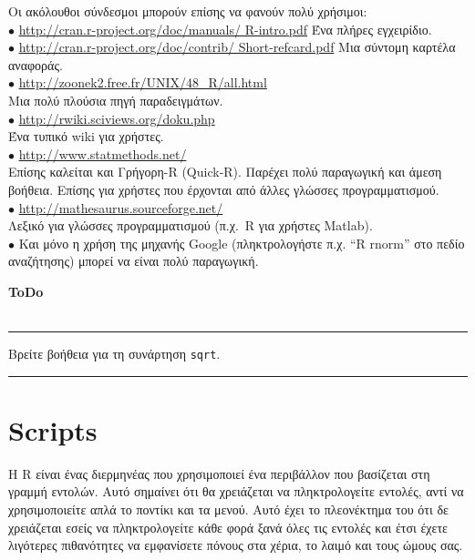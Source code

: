 \documentclass[a4paper,11pt,twocolumn,tablecaptionabove]{scrartcl}
\newenvironment{ToDo} {%
  \begin{flushright}
    \hfill
    \begin{minipage}{0.95\columnwidth}         %
    \textsf{\textbf{ToDo}} \\
      \vspace{-0.85cm}\\
      {\color{Gray}\rule[-0.1cm]{\columnwidth}{1.5pt}}} { %
      {\color{Gray} \rule[0.3cm]{\columnwidth}{1.5pt}}
    \end{minipage}
    \vspace{1em}
  \end{flushright}
  }
\begin{document}
Οι ακόλουθοι σύνδεσμοι μπορούν επίσης να φανούν πολύ χρήσιμοι:\\
\noindent $\bullet$ \url{http://cran.r-project.org/doc/manuals/ R-intro.pdf} Ένα πλήρες εγχειρίδιο.\\
\noindent $\bullet$ \url{http://cran.r-project.org/doc/contrib/ Short-refcard.pdf} Μια σύντομη καρτέλα
αναφοράς.\\
\noindent $\bullet$  \url{http://zoonek2.free.fr/UNIX/48\_R/all.html}\\
  Μια πολύ πλούσια πηγή παραδειγμάτων.\\
\noindent $\bullet$  \url{http://rwiki.sciviews.org/doku.php}\\
  Ένα τυπικό wiki για χρήστες.\\
\noindent $\bullet$ \url{http://www.statmethods.net/}\\
    Επίσης καλείται και Γρήγορη-R (Quick-R). Παρέχει πολύ παραγωγική και άμεση βοήθεια. Επίσης για χρήστες
    που έρχονται από άλλες γλώσσες προγραμματισμού. \\
    \noindent $\bullet$ \url{http://mathesaurus.sourceforge.net/}\\
    Λεξικό για γλώσσες προγραμματισμού (π.χ.~R για χρήστες Matlab). \\
\noindent $\bullet$  Και μόνο η χρήση της μηχανής Google (πληκτρολογήστε π.χ. ``R rnorm'' στο πεδίο αναζήτησης)
μπορεί να είναι πολύ παραγωγική.\\

\begin{ToDo}
Βρείτε βοήθεια για τη συνάρτηση \texttt{sqrt}.\\
\end{ToDo}


\section{Scripts}

Η R είναι ένας διερμηνέας που χρησιμοποιεί ένα περιβάλλον που βασίζεται στη γραμμή εντολών. Αυτό σημαίνει
ότι θα χρειάζεται να πληκτρολογείτε εντολές, αντί να χρησιμοποιείτε απλά το ποντίκι και τα μενού. Αυτό έχει
το πλεονέκτημα του ότι δε χρειάζεται εσείς να πληκτρολογείτε κάθε φορά ξανά όλες τις εντολές και έτσι έχετε
λιγότερες πιθανότητες να εμφανίσετε πόνους στα χέρια, το λαιμό και τους ώμους σας.
\end{document}
